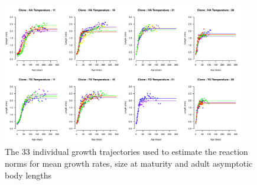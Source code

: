 \begin{figure}[!h] %
\centering
\includegraphics[width=0.95\textwidth]{5_ChapExp3/fig/FigS1}
\caption[Individual growth trajectories]{
The 33 individual growth trajectories used to estimate the reaction norms for mean growth rates, size at maturity and adult asymptotic body lengths}
\label{Fig5-S1}
\end{figure}

\newpage


